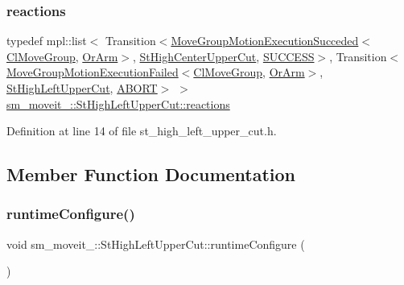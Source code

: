 \subsubsection{\texorpdfstring{reactions}{reactions}}
{\footnotesize\ttfamily typedef mpl\+::list$<$ Transition$<$\hyperlink{structmove__group__interface__client_1_1MoveGroupMotionExecutionSucceded}{Move\+Group\+Motion\+Execution\+Succeded}$<$\hyperlink{classmove__group__interface__client_1_1ClMoveGroup}{Cl\+Move\+Group}, \hyperlink{classsm__moveit__3_1_1OrArm}{Or\+Arm}$>$, \hyperlink{structsm__moveit__3_1_1StHighCenterUpperCut}{St\+High\+Center\+Upper\+Cut}, \hyperlink{classSUCCESS}{S\+U\+C\+C\+E\+SS}$>$, Transition$<$\hyperlink{structmove__group__interface__client_1_1MoveGroupMotionExecutionFailed}{Move\+Group\+Motion\+Execution\+Failed}$<$\hyperlink{classmove__group__interface__client_1_1ClMoveGroup}{Cl\+Move\+Group}, \hyperlink{classsm__moveit__3_1_1OrArm}{Or\+Arm}$>$, \hyperlink{structsm__moveit__3_1_1StHighLeftUpperCut}{St\+High\+Left\+Upper\+Cut}, \hyperlink{classABORT}{A\+B\+O\+RT}$>$ $>$ \hyperlink{structsm__moveit__3_1_1StHighLeftUpperCut_a26a27ee4a7e89a86f60919e51ef9a51b}{sm\+\_\+moveit\+\_\+::\+St\+High\+Left\+Upper\+Cut\+::reactions}}



Definition at line 14 of file st\+\_\+high\+\_\+left\+\_\+upper\+\_\+cut.\+h.



\subsection{Member Function Documentation}
\mbox{\label{structsm__moveit__3_1_1StHighLeftUpperCut_a7e6c9b36cd6246271da8ae42bf35e9ad}} 
\subsubsection{\texorpdfstring{runtime\+Configure()}{runtimeConfigure()}}
{\footnotesize\ttfamily void sm\+\_\+moveit\+\_\+::\+St\+High\+Left\+Upper\+Cut\+::runtime\+Configure (\begin{DoxyParamCaption}{ }\end{DoxyParamCaption})\hspace{0.3cm}{\ttfamily [inline]}}



